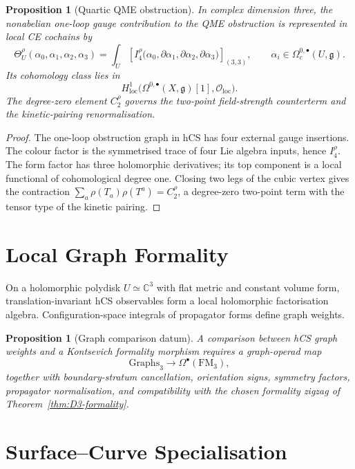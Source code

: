 \documentclass[11pt]{amsart}
\newtheorem{proposition}[theorem]{Proposition}
\theoremstyle{definition}
\theoremstyle{remark}
\providecommand{\cO}{\mathcal{O}}
\providecommand{\CC}{\mathbb{C}}
\providecommand{\FM}{\mathrm{FM}}
\providecommand{\Graphs}{\mathrm{Graphs}}
\providecommand{\gfrak}{\mathfrak{g}}
\begin{document}
\begin{proposition}[Quartic QME obstruction]
\label{prop:quartic-qme}
In complex dimension three, the nonabelian one-loop gauge contribution
to the QME obstruction is represented in local CE cochains by
\[
\Theta^\rho_U(\alpha_0,\alpha_1,\alpha_2,\alpha_3)
=
\int_U
\left[
I_4^\rho\bigl(
\alpha_0,\partial\alpha_1,\partial\alpha_2,\partial\alpha_3
\bigr)
\right]_{(3,3)},
\qquad
\alpha_i\in\Omega_c^{0,\bullet}(U,\gfrak).
\]
Its cohomology class lies in
\[
H^1_{\mathrm{loc}}
\bigl(\Omega^{0,\bullet}(X,\gfrak)[1],\cO_{\mathrm{loc}}\bigr).
\]
The degree-zero element $C_2^\rho$ governs the two-point field-strength
counterterm and the kinetic-pairing renormalisation.
\end{proposition}

\begin{proof}
The one-loop obstruction graph in hCS has four external gauge insertions.
The colour factor is the symmetrised trace of four Lie algebra inputs,
hence $I_4^\rho$. The form factor has three holomorphic derivatives; its
top component is a local functional of cohomological degree one. Closing
two legs of the cubic vertex gives the contraction
$\sum_a\rho(T_a)\rho(T^a)=C_2^\rho$, a degree-zero two-point term with
the tensor type of the kinetic pairing.
\end{proof}

\section{Local Graph Formality}
\label{sec:local-graph-formality}

On a holomorphic polydisk $U\simeq\CC^3$ with flat metric and constant
volume form, translation-invariant hCS observables form a local
holomorphic factorisation algebra. Configuration-space integrals of
propagator forms define graph weights.

\begin{proposition}[Graph comparison datum]
\label{prop:graph-comparison}
A comparison between hCS graph weights and a Kontsevich formality
morphism requires a graph-operad map
\[
\Graphs_3\longrightarrow\Omega^\bullet(\FM_3),
\]
together with boundary-stratum cancellation, orientation signs, symmetry
factors, propagator normalisation, and compatibility with the chosen
formality zigzag of Theorem~\ref{thm:D3-formality}.
\end{proposition}

\section{Surface--Curve Specialisation}
\label{sec:surface-curve-specialisation}
\end{document}
